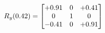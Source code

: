 \documentclass[preview]{standalone}
\begin{document}
\begin{align*}
\special{dvisvgm:raw <g id='unique000'>}R_{y}(0.42) = \begin{bmatrix}+0.91 & 0 & +0.41 \\0 & 1 & 0 \\-0.41 & 0 & +0.91\end{bmatrix}\special{dvisvgm:raw </g>}
\end{align*}
\end{document}
